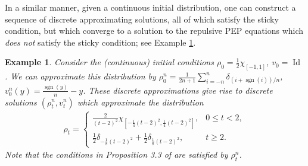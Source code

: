 \documentclass[11pt]{article}
\newtheorem{example}[theorem]{Example}
\numberwithin{equation}{section}
\DeclareMathOperator{\sgn}{sgn}
\DeclareMathOperator{\Id}{Id}
\begin{document}
        In a similar manner, given a continuous initial distribution, one can construct a sequence of discrete approximating solutions, all of which satisfy the sticky condition, but which converge to a solution to the repulsive PEP equations which \emph{does not} satisfy the sticky condition; see Example \ref{bad-approximation}. 
        \begin{example}\label{bad-approximation}Consider the (continuous) initial conditions $\rho_0=\frac{1}{2}\chi_{[-1,1]}$, $v_0=\Id$. We can approximate this distribution by $\rho_0^{n}=\frac{1}{2n+1}\sum_{i=-n}^n\delta_{(i+\sgn(i))/n}$, $v_0^n(y)=\frac{\sgn(y)}{n}-y$. These discrete approximations give rise to discrete solutions $(\rho_t^n,v_t^n)$ which approximate the distribution
            \begin{align*}
                \rho_t=\begin{cases}\frac{2}{(t-2)^2}\chi_{[-\frac{1}{4}(t-2)^2,\frac{1}{4}(t-2)^2]}, &0\leq t<2,
                \\
                \frac{1}{2}\delta_{-\frac{1}{8}(t-2)^2}+\frac{1}{2}\delta_{\frac{1}{8}(t-2)^2}, &t\geq2.\end{cases}
            \end{align*}
            Note that the conditions in Proposition 3.3 of \cite{Tudorascu-2008} are satisfied by $\rho_t^n$. 
        \end{example}
\end{document}
